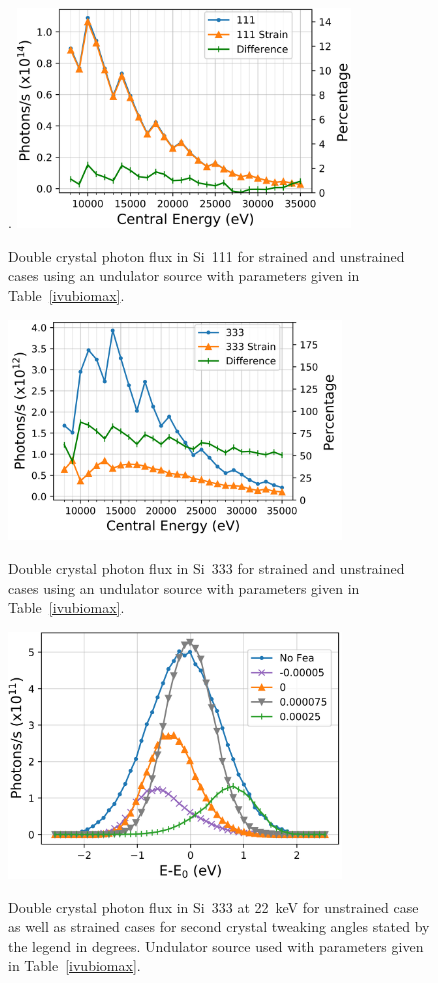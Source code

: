 \documentclass{iucr}
\begin{document}
\begin{figure}
\caption{Double crystal photon flux in Si~111 for strained and unstrained cases using an undulator source with parameters given in Table~\ref{ivubiomax}.}.
\includegraphics[width = 8.85cm]{images/ivu111flux.png}
\label{fig:ivu111flux}
\end{figure}

\begin{figure}
\caption{Double crystal photon flux in Si~333 for strained and unstrained cases using an undulator source with parameters given in Table~\ref{ivubiomax}.}
\includegraphics[width = 8.85cm]{images/ivu333flux.png}
\label{fig:ivu333flux}
\end{figure}

\begin{figure}
\caption{Double crystal photon flux in Si~333 at 22~keV for unstrained case as well as strained cases for second crystal tweaking angles stated by the legend in degrees. Undulator source used with parameters given in Table~\ref{ivubiomax}.}
\includegraphics[width = 8.85cm]{images/26kevangle.png}
\label{fig:26kevangle}
\end{figure}
\end{document}

